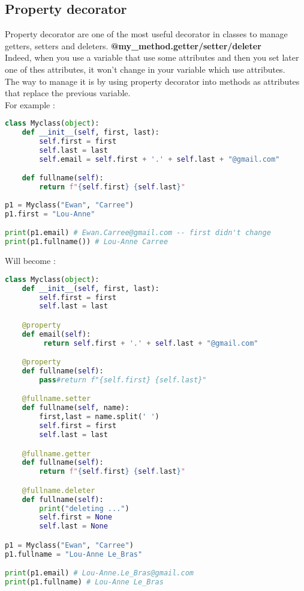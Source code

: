 \documentclass[a4paper, 12pt, titlepage]{scrartcl} %
\begin{document}
\subsection{Property decorator}
\label{subsec:Property}
Property decorator are one of the most useful decorator in classes to manage getters, setters and deleters. \textbf{@my\_method.getter/setter/deleter}\\
Indeed, when you use a variable that use some attributes and then you set later one of thes attributes, it won't change in your variable which use attributes. \\
The way to manage it is by using property decorator into methods as attributes that replace the previous variable. \\
For example :
\begin{lstlisting}[language=Python]
class Myclass(object):
	def __init__(self, first, last):
		self.first = first
		self.last = last
		self.email = self.first + '.' + self.last + "@gmail.com"

	def fullname(self):
		return f"{self.first} {self.last}"
		
p1 = Myclass("Ewan", "Carree")
p1.first = "Lou-Anne"

print(p1.email) # Ewan.Carree@gmail.com -- first didn't change
print(p1.fullname()) # Lou-Anne Carree
\end{lstlisting}
Will become :
\begin{lstlisting}[language=Python]
class Myclass(object):
	def __init__(self, first, last):
		self.first = first
		self.last = last

	@property
	def email(self):
		 return self.first + '.' + self.last + "@gmail.com"

	@property
	def fullname(self):
		pass#return f"{self.first} {self.last}"

	@fullname.setter
	def fullname(self, name):
		first,last = name.split(' ')
		self.first = first
		self.last = last

	@fullname.getter
	def fullname(self):
		return f"{self.first} {self.last}"

	@fullname.deleter
	def fullname(self):
		print("deleting ...")
		self.first = None
		self.last = None

p1 = Myclass("Ewan", "Carree")
p1.fullname = "Lou-Anne Le_Bras"

print(p1.email) # Lou-Anne.Le_Bras@gmail.com
print(p1.fullname) # Lou-Anne Le_Bras
\end{lstlisting}
\end{document}
